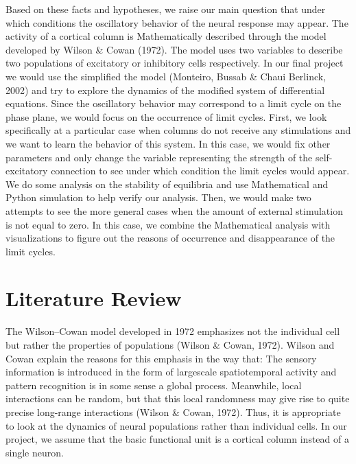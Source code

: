 \documentclass[12pt]{article}
\begin{document}
Based on these facts and hypotheses, we raise our main question that under which conditions the oscillatory behavior of the neural response may appear. The activity of a cortical column is Mathematically described through the model developed by Wilson \& Cowan (1972). The model uses two variables to describe two populations of excitatory or inhibitory cells respectively. In our final project we would use the simplified the model (Monteiro, Bussab \& Chaui Berlinck, 2002) and try to explore the dynamics of the modified system of differential equations. Since the oscillatory behavior may correspond to a limit cycle on the phase plane, we would focus on the occurrence of limit cycles.
First, we look specifically at a particular case when columns do not receive any stimulations and we want to learn the behavior of this system. In this case, we would fix other parameters and only change the variable representing the strength of the self-excitatory connection to see under which condition the limit cycles would appear. We do some analysis on the stability of equilibria and use Mathematical and Python simulation to help verify our analysis. Then, we would make two attempts to see the more general cases when the amount of external stimulation is not equal to zero. In this case, we combine the Mathematical analysis with visualizations to figure out the reasons of occurrence and disappearance of the limit cycles.




\section{ Literature Review}

The Wilson–Cowan model developed in 1972 emphasizes not the individual cell but rather the properties of populations (Wilson \& Cowan, 1972). Wilson and Cowan explain the reasons for this emphasis in the way that: The sensory information is introduced in the form of largescale spatiotemporal activity and pattern recognition is in some sense a global process. Meanwhile, local interactions can be random, but that this local randomness may give rise to quite precise long-range interactions (Wilson \& Cowan, 1972). Thus, it is appropriate to look at the dynamics of neural populations rather than individual cells. In our project, we assume that the basic functional unit is a cortical column instead of a single neuron.
\end{document}

